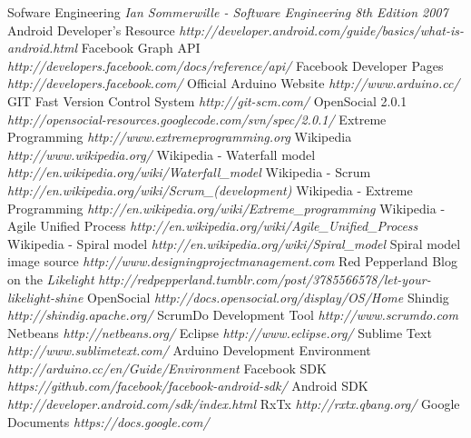 \begin{thebibliography}{99}
 Sofware Engineering {\em Ian Sommerwille - Software Engineering 8th Edition 2007}
 Android Developer's Resource  {\em http://developer.android.com/guide/basics/what-is-android.html}
 Facebook Graph API {\em http://developers.facebook.com/docs/reference/api/}
 Facebook Developer Pages {\em http://developers.facebook.com/}
 Official Arduino Website {\em http://www.arduino.cc/}
 GIT Fast Version Control System {\em http://git-scm.com/}
 OpenSocial 2.0.1 {\em http://opensocial-resources.googlecode.com/svn/spec/2.0.1/}
 Extreme Programming {\em http://www.extremeprogramming.org}
 Wikipedia {\em http://www.wikipedia.org/}
 Wikipedia - Waterfall model {\em http://en.wikipedia.org/wiki/Waterfall\_model}
 Wikipedia - Scrum {\em http://en.wikipedia.org/wiki/Scrum\_(development)}
 Wikipedia - Extreme Programming {\em http://en.wikipedia.org/wiki/Extreme\_programming}
 Wikipedia - Agile Unified Process {\em http://en.wikipedia.org/wiki/Agile\_Unified\_Process}
 Wikipedia - Spiral model {\em http://en.wikipedia.org/wiki/Spiral\_model}
 Spiral model image source {\em http://www.designingprojectmanagement.com}
 Red Pepperland Blog on the \emph{Likelight} {\em http://redpepperland.tumblr.com/post/3785566578/let-your-likelight-shine}
 OpenSocial {\em http://docs.opensocial.org/display/OS/Home}
 Shindig {\em http://shindig.apache.org/}
 ScrumDo Development Tool {\em http://www.scrumdo.com}
 Netbeans {\em http://netbeans.org/}
 Eclipse {\em http://www.eclipse.org/}
 Sublime Text {\em http://www.sublimetext.com/}
 Arduino Development Environment {\em http://arduino.cc/en/Guide/Environment}
 Facebook SDK {\em https://github.com/facebook/facebook-android-sdk/}
 Android SDK {\em http://developer.android.com/sdk/index.html}
 RxTx {\em http://rxtx.qbang.org/}
 Google Documents {\em https://docs.google.com/}

\end{thebibliography}
